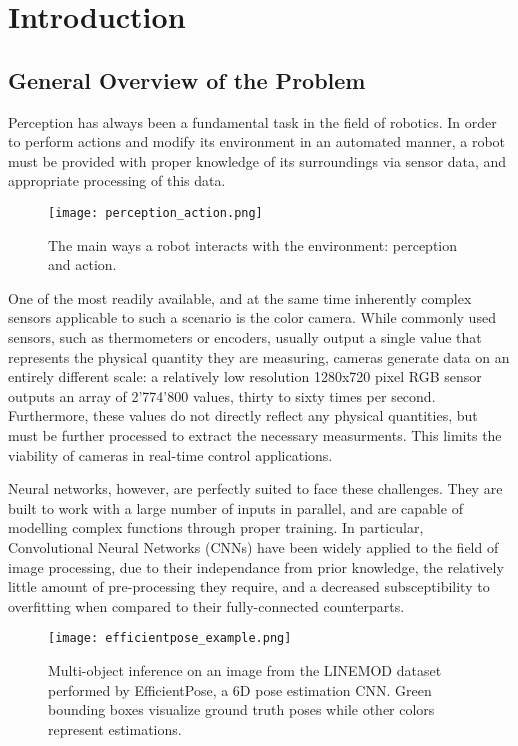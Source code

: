 \chapter{Introduction}

\section{General Overview of the Problem}

Perception has always been a fundamental task in the field of robotics. In order to perform actions and modify its environment in an automated manner, a robot must be provided with proper knowledge of its surroundings via sensor data, and appropriate processing of this data.

\begin{figure}[ht]
    \texttt{[image: perception\_action.png]}
    \caption{The main ways a robot interacts with the environment: perception and action.}
\end{figure}

One of the most readily available, and at the same time inherently complex sensors applicable to such a scenario is the color camera. While commonly used sensors, such as thermometers or encoders, usually output a single value that represents the physical quantity they are measuring, cameras generate data on an entirely different scale: a relatively low resolution 1280x720 pixel RGB sensor outputs an array of 2'774'800 values, thirty to sixty times per second. Furthermore, these values do not directly reflect any physical quantities, but must be further processed to extract the necessary measurments. This limits the viability of cameras in real-time control applications.

Neural networks, however, are perfectly suited to face these challenges. They are built to work with a large number of inputs in parallel, and are capable of modelling complex functions through proper training. In particular, Convolutional Neural Networks (CNNs) have been widely applied to the field of image processing, due to their independance from prior knowledge, the relatively little amount of pre-processing they require, and a decreased subsceptibility to overfitting when compared to their fully-connected counterparts.

\begin{figure}[ht]
    \texttt{[image: efficientpose\_example.png]}
    \caption{Multi-object inference on an image from the LINEMOD\cite{linemod} dataset performed by EfficientPose\cite{bukschat2020efficientpose}, a 6D pose estimation CNN. Green bounding boxes visualize ground truth poses while other colors represent estimations.} 
\end{figure}

